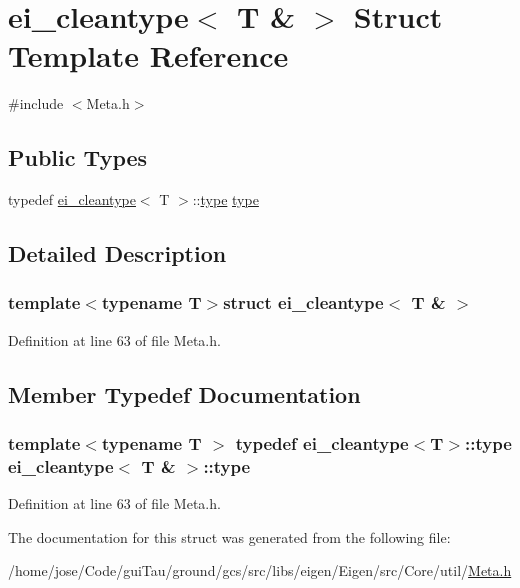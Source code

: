 \hypertarget{structei__cleantype_3_01_t_01_6_01_4}{\section{ei\-\_\-cleantype$<$ T \& $>$ Struct Template Reference}
\label{structei__cleantype_3_01_t_01_6_01_4}
}


{\ttfamily \#include $<$Meta.\-h$>$}

\subsection*{Public Types}
\begin{DoxyCompactItemize}
\item 
typedef \hyperlink{structei__cleantype}{ei\-\_\-cleantype}$<$ T $>$\-::\hyperlink{structei__cleantype_3_01_t_01_6_01_4_a4e80ec6a01a002774e4befd2e23c9178}{type} \hyperlink{structei__cleantype_3_01_t_01_6_01_4_a4e80ec6a01a002774e4befd2e23c9178}{type}
\end{DoxyCompactItemize}


\subsection{Detailed Description}
\subsubsection*{template$<$typename T$>$struct ei\-\_\-cleantype$<$ T \& $>$}



Definition at line 63 of file Meta.\-h.



\subsection{Member Typedef Documentation}
\hypertarget{structei__cleantype_3_01_t_01_6_01_4_a4e80ec6a01a002774e4befd2e23c9178}{
\subsubsection[{type}]{\setlength{\rightskip}{0pt plus 5cm}template$<$typename T $>$ typedef {\bf ei\-\_\-cleantype}$<$T$>$\-::{\bf type} {\bf ei\-\_\-cleantype}$<$ T \& $>$\-::{\bf type}}}\label{structei__cleantype_3_01_t_01_6_01_4_a4e80ec6a01a002774e4befd2e23c9178}


Definition at line 63 of file Meta.\-h.



The documentation for this struct was generated from the following file\-:\begin{DoxyCompactItemize}
\item 
/home/jose/\-Code/gui\-Tau/ground/gcs/src/libs/eigen/\-Eigen/src/\-Core/util/\hyperlink{_meta_8h}{Meta.\-h}\end{DoxyCompactItemize}
